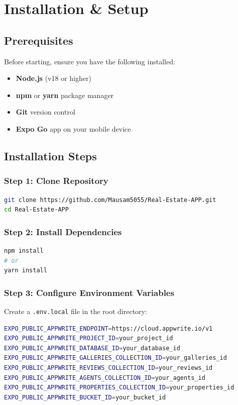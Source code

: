 \documentclass[11pt,a4paper,oneside]{book}
\begin{document}
\chapter{Installation \& Setup}

\section{Prerequisites}

Before starting, ensure you have the following installed:

\begin{itemize}
    \item \textbf{Node.js} (v18 or higher)
    \item \textbf{npm} or \textbf{yarn} package manager
    \item \textbf{Git} version control
    \item \textbf{Expo Go} app on your mobile device
\end{itemize}

\section{Installation Steps}

\subsection{Step 1: Clone Repository}

\begin{lstlisting}[language=bash]
git clone https://github.com/Mausam5055/Real-Estate-APP.git
cd Real-Estate-APP
\end{lstlisting}

\subsection{Step 2: Install Dependencies}

\begin{lstlisting}[language=bash]
npm install
# or
yarn install
\end{lstlisting}

\subsection{Step 3: Configure Environment Variables}

Create a \texttt{.env.local} file in the root directory:

\begin{lstlisting}[language=bash]
EXPO_PUBLIC_APPWRITE_ENDPOINT=https://cloud.appwrite.io/v1
EXPO_PUBLIC_APPWRITE_PROJECT_ID=your_project_id
EXPO_PUBLIC_APPWRITE_DATABASE_ID=your_database_id
EXPO_PUBLIC_APPWRITE_GALLERIES_COLLECTION_ID=your_galleries_id
EXPO_PUBLIC_APPWRITE_REVIEWS_COLLECTION_ID=your_reviews_id
EXPO_PUBLIC_APPWRITE_AGENTS_COLLECTION_ID=your_agents_id
EXPO_PUBLIC_APPWRITE_PROPERTIES_COLLECTION_ID=your_properties_id
EXPO_PUBLIC_APPWRITE_BUCKET_ID=your_bucket_id
\end{lstlisting}
\end{document}
